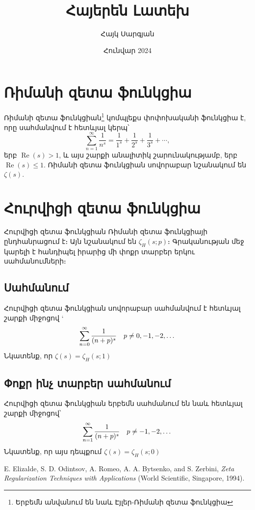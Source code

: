 \documentclass[a4paper]{article}
\title{Հայերեն Լատեխ}
\author{Հայկ Սարգյան}
\date{Հունվար 2024}
\begin{document}
\maketitle
\tableofcontents

\section{Ռիմանի զետա ֆունկցիա}
Ռիմանի զետա ֆունկցիան\footnote{Երբեմն անվանում են նաև Էյլեր-Ռիմանի զետա ֆունկցիա} կոմպլեքս փոփոխականի ֆունկցիա է, որը սահմանվում է հետևյալ կերպ՝
%
\begin{equation}
\sum_{n=1}^\infty \frac{1}{n^s} = \frac{1}{1^s} + \frac{1}{2^s} + \frac{1}{3^s} + \cdots,
\end{equation}
%
%
երբ \(\operatorname{Re}(s) > 1\), և այս շարքի անալիտիկ շարունակությամբ, երբ \(\operatorname{Re}(s) \leq 1\).  Ռիմանի զետա ֆունկցիան սովորաբար նշանակում են \(\zeta(s)\).

\section{Հուրվիցի զետա ֆունկցիա}
Հուրվիցի զետա ֆունկցիան Ռիմանի զետա ֆունկցիայի ընդհանրացում է։ Այն նշանակում են \(\zeta_H(s;p)\)։ Գրականության մեջ կարելի է հանդիպել իրարից մի փոքր տարբեր երկու սահմանումների։

\subsection{Սահմանում}
Հուրվիցի զետա ֆունկցիան սովորաբար սահմանվում է հետևյալ շարքի միջոցով \cite{book:elizalde_zeta}`
%
\begin{equation}
\sum_{n=0}^{\infty}\frac{1}{(n+p)^s} \quad p \ne 0, -1, -2, \dots \\
\end{equation}
%
%
Նկատենք, որ \(\zeta(s) = \zeta_H(s;1)\)

\subsection{Փոքր ինչ տարբեր սահմանում}
%
Հուրվիցի զետա ֆունկցիան երբեմն սահմանում են նաև հետևյալ շարքի միջոցով՝
%
\begin{equation}
\sum_{n=1}^{\infty}\frac{1}{(n+p)^s} \quad p \ne -1, -2, \dots \\
\end{equation}
%
%
Նկատենք, որ այս դեպքում \(\zeta(s) = \zeta_H(s;0)\)

\begin{thebibliography}{1}
 E. Elizalde, S. D. Odintsov, A. Romeo, A. A. Bytsenko, and S. Zerbini, \emph{Zeta Regularization Techniques with Applications} (World Scientific, Singapore, 1994).


\end{thebibliography}
\end{document}
